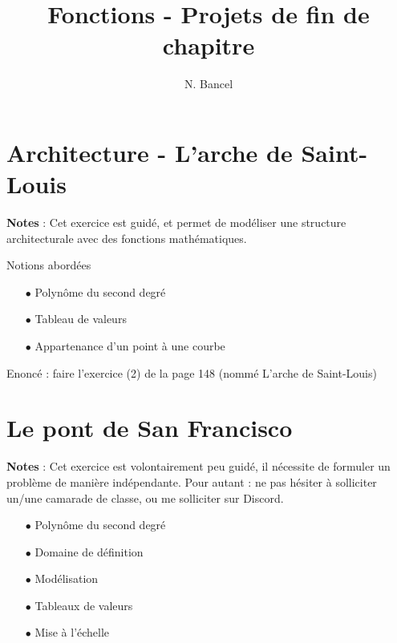 \documentclass[a4paper,12pt]{article}
\begin{document}
\title{Fonctions - Projets de fin de chapitre}
\author{N. Bancel}

\sloppy  %
\maketitle

\section{Architecture - L'arche de Saint-Louis}

\begin{tcolorbox}
  \textbf{Notes} : Cet exercice est guidé, et permet de modéliser une structure architecturale avec des fonctions mathématiques. \par
  Notions abordées
  \begin{itemize}[noitemsep]
    \item[$\bullet$] Polynôme du second degré
    \item[$\bullet$] Tableau de valeurs
    \item[$\bullet$] Appartenance d'un point à une courbe
  \end{itemize}
  \end{tcolorbox}

Enoncé : faire l'exercice (2) de la page 148 (nommé L'arche de Saint-Louis)


\section{Le pont de San Francisco}

\begin{tcolorbox}
  \textbf{Notes} : Cet exercice est volontairement peu guidé, il nécessite de formuler un problème de manière indépendante. Pour autant : ne pas hésiter à solliciter un/une camarade de classe, ou me solliciter sur Discord.
  \begin{itemize}[noitemsep]
    \item[$\bullet$] Polynôme du second degré
    \item[$\bullet$] Domaine de définition
    \item[$\bullet$] Modélisation
    \item[$\bullet$] Tableaux de valeurs
    \item[$\bullet$] Mise à l'échelle
  \end{itemize}
  \end{tcolorbox}
\end{document}

